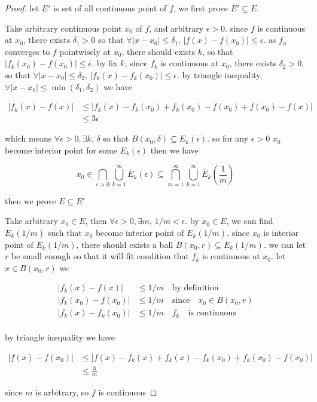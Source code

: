 \documentclass[11pt,a4paper]{article}
\begin{document}
\begin{proof}
    let $E'$ is set of all continuous point of $f$, we first prove $E' \subseteq E$.

    Take arbitrary continuous point $x_0$ of $f$, and arbitrary $\epsilon > 0$. since $f$ is continuous at $x_0$, there exists $\delta_1 > 0$ so that
    $\forall |x-x_0| \le \delta_1,\, |f(x) - f(x_0) | \le \epsilon$. as $f_n$ converges to $f$ pointwisely at $x_0$, there should exists $k$, so that 
    $|f_k(x_0) - f(x_0) | \le \epsilon$. by fix $k$, since $f_k$ is continuous at $x_0$, there exists $\delta_2 > 0$, so that
    $\forall |x-x_0| \le \delta_2,\, |f_k(x) - f_k(x_0)| \le \epsilon$. by triangle inequality, $\forall |x-x_0| \le \min(\delta_1, \delta_2)$ we have

    \begin{align*}
        |f_k(x) - f(x)| &\le |f_k(x) - f_k(x_0) + f_k(x_0) - f(x_0) + f(x_0) - f(x)| \\
        & \le 3\epsilon
    \end{align*}

    which means $\forall \epsilon > 0, \exists k,\,\delta$ so that $ B(x_0, \delta) \subseteq E_k(\epsilon)$. so for any $\epsilon > 0$ $x_0$ become interior point for some $E_k(\epsilon)$
    then we have

    \[
        x_0 \in \bigcap_{\epsilon > 0}\bigcup_{k=1}^{\infty} \mathring{E_k}(\epsilon) \subseteq \bigcap_{m=1}^{\infty}\bigcup_{k=1}^{\infty} \mathring{E_k}(\frac{1}{m})
    \]

    then we prove $E \subseteq E'$

    Take arbitrary $x_0 \in E$, then $\forall \epsilon > 0, \exists m,\, 1/m < \epsilon$. by $x_0 \in E$, we can find
    $E_k(1/m)$ such that $x_0$ become interior point of $E_k(1/m)$. since $x_0$ is interior point of $E_k(1/m)$, there should exists a ball 
    $B(x_0, r) \subseteq E_k(1/m)$. we can let $r$ be small enough so that it will fit condition that $f_k$ is continuous at $x_0$. let $x \in B(x_0, r)$ we

    \begin{align*}
        | f_k(x) - f(x) | &\le 1/m \quad \text{by definition}\\
        | f_k(x_0) - f(x_0) | &\le 1/m \quad \text{since} \quad x_0 \in B(x_0, r)\\
        | f_k(x) - f_k(x_0) | & \le 1/m \quad f_k \quad \text{is continuous}\\
    \end{align*}

    by triangle inequality we have

    \begin{align*}
        |f(x) - f(x_0) | &\le |f(x) -f_k(x) + f_k(x) - f_k(x_0) + f_k(x_0) - f(x_0) | \\
        & \le \frac{3}{m}
    \end{align*}

    since $m$ is arbitrary, so $f$ is continuous

\end{proof}
\end{document}
